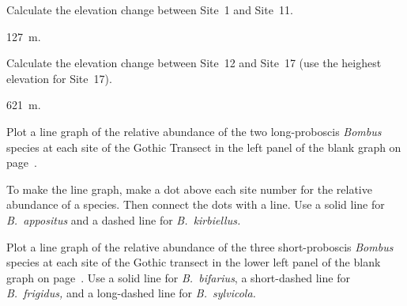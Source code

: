 \documentclass[12pt, hidelinks]{exam}
\newcommand*\AnswerBox[2]{%
    \parbox[t][#1]{0.92\textwidth}{%
    \begin{solution}#2\end{solution}}
    \vspace{\stretch{1}}
}
\begin{document}
\begin{questions}
\question
Calculate the elevation change between Site~1 and Site~11.

\AnswerBox{\baselineskip}{127~m.}

\question
Calculate the elevation change between Site~12 and Site~17 (use the 
heighest elevation for Site~17).

\AnswerBox{\baselineskip}{621~m.}



\question
Plot a line graph of the relative abundance of the two long-proboscis \textit{Bombus} species at each site of the Gothic Transect in the left panel of the blank graph on page~\pageref{fig:relative_abundance}. 

To make the line graph, make a dot above each site number
for the relative abundance of a species. Then connect the dots with a line. Use a solid line for \textit{B.~appositus} and a dashed 
line for \textit{B.~kirbiellus.}

\question
Plot a line graph of the relative abundance of the three 
short-proboscis \textit{Bombus} species at each site of the Gothic 
transect in the lower left panel of the blank graph on 
page~\pageref{fig:relative_abundance}. Use a solid line for 
\textit{B.~bifarius}, a short-dashed line for \textit{B.~frigidus,} 
and a long-dashed line for \textit{B.~sylvicola.}


\end{questions}
\end{document}
